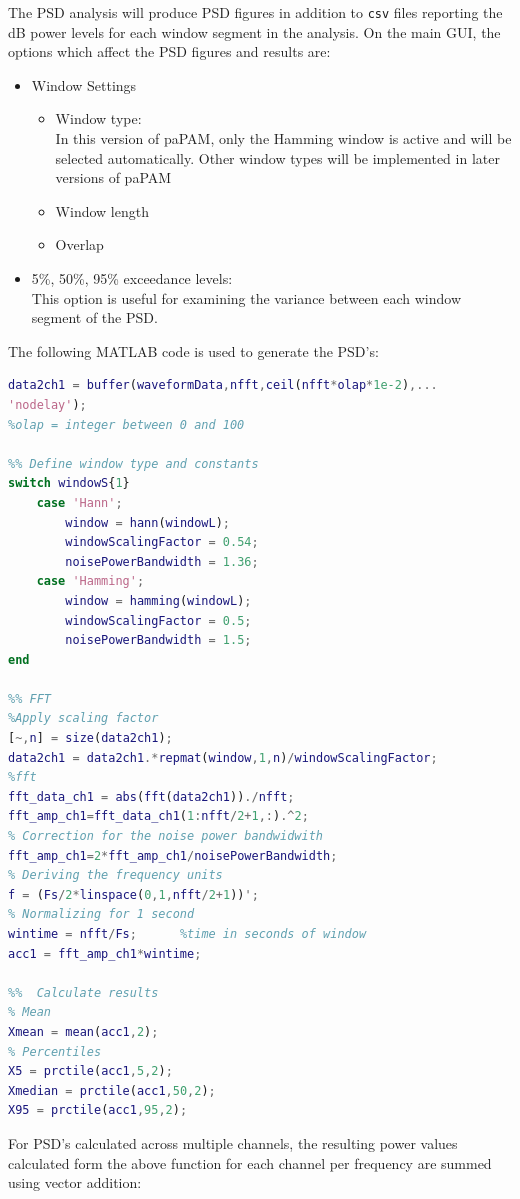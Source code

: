 \documentclass[11pt]{report}
\begin{document}
The PSD analysis will produce PSD figures in addition to \texttt{csv} files reporting the dB power levels for each window segment in the analysis.  On the main GUI, the options which affect the PSD figures and results are:
\begin{itemize}
\item Window Settings
\begin{itemize}
\item Window type:\\
In this version of paPAM, only the Hamming window is active and will be selected automatically.  Other window types will be implemented in later versions of paPAM
\item Window length
\item Overlap
\end{itemize}
\item 5\%, 50\%, 95\% exceedance levels:\\
This option is useful for examining the variance between each window segment of the PSD.
\end{itemize}

The following MATLAB code is used to generate the PSD's:

\begin{lstlisting}[style=github, language=MATLAB]
%Chop waveform into segments
data2ch1 = buffer(waveformData,nfft,ceil(nfft*olap*1e-2),...
'nodelay');
%olap = integer between 0 and 100

%% Define window type and constants
switch windowS{1}
	case 'Hann';
    	window = hann(windowL);
		windowScalingFactor = 0.54;
		noisePowerBandwidth = 1.36;
	case 'Hamming';
		window = hamming(windowL);
		windowScalingFactor = 0.5;
		noisePowerBandwidth = 1.5;
end

%% FFT
%Apply scaling factor
[~,n] = size(data2ch1);
data2ch1 = data2ch1.*repmat(window,1,n)/windowScalingFactor;
%fft
fft_data_ch1 = abs(fft(data2ch1))./nfft;
fft_amp_ch1=fft_data_ch1(1:nfft/2+1,:).^2;
% Correction for the noise power bandwidwith
fft_amp_ch1=2*fft_amp_ch1/noisePowerBandwidth;
% Deriving the frequency units
f = (Fs/2*linspace(0,1,nfft/2+1))';
% Normalizing for 1 second
wintime = nfft/Fs;      %time in seconds of window
acc1 = fft_amp_ch1*wintime;

%%  Calculate results
% Mean
Xmean = mean(acc1,2);
% Percentiles
X5 = prctile(acc1,5,2);
Xmedian = prctile(acc1,50,2);
X95 = prctile(acc1,95,2);
\end{lstlisting}

For PSD's calculated across multiple channels, the resulting power values calculated form the above function for each channel per frequency are summed using vector addition: \\
\end{document}
